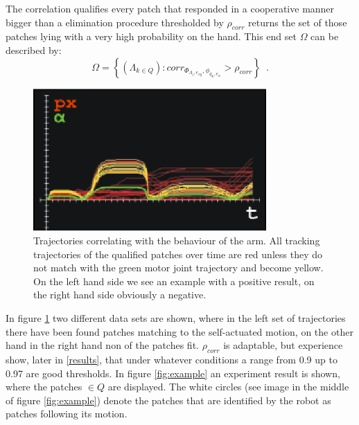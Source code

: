 The correlation qualifies every patch that responded in a cooperative manner bigger than a elimination procedure thresholded by $\rho_{corr}$ returns the set of those patches lying with a very high probability on the hand. This end set $\Omega$ can be described by:
%
\begin{equation}
\label{endset}
 \Omega = \left\lbrace \left( \Lambda_{k \in Q} \right): corr_{\Phi_{\Lambda_{i}, e_{xy}}, \phi_{q_{k}, e_{\alpha}}} > \rho_{corr} \right\rbrace \enspace .
\end{equation}
%
\begin{figure}[h]
	\begin{center}
		\includegraphics[width=3.5in]{imgs/method/correlation.ps}
		\caption[Trajectories correlating with the behaviour of the arm. ]{Trajectories correlating with the behaviour of the arm. All tracking trajectories of the qualified patches over time are red unless they do not match with the green motor joint trajectory and become yellow. On the left hand side we see an example with a positive result, on the right hand side obviously a negative.}
		\label{fig:corr}
	\end{center}
\end{figure}
%
In figure \ref{fig:corr} two different data sets are shown, where in the left set of trajectories there have been found patches matching to the self-actuated motion, on the other hand in the right hand non of the patches fit. $\rho_{corr}$ is adaptable, but experience show, later in \ref{results}, that under whatever conditions a range from 0.9 up to 0.97 are good thresholds. In figure \ref{fig:example} an experiment result is shown, where the patches $\in Q$ are displayed. The white circles (see image in the middle of figure \ref{fig:example}) denote the patches that are identified by the robot as patches following its motion.
%

